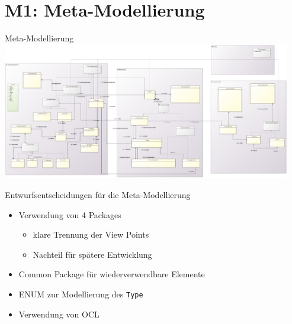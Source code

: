 \section[M1: Metamodell]{M1: Meta-Modellierung}
\begin{frame}{Meta-Modellierung}
	\centering
	\includegraphics[height=60mm]{figures/meta-modell.png}
\end{frame}

\begin{frame}{Entwurfsentscheidungen für die Meta-Modellierung}
	\begin{itemize}
		\item Verwendung von 4 Packages
		\begin{itemize}
			\item klare Trennung der View Points
			\item Nachteil für spätere Entwicklung
		\end{itemize}
		
		\item Common Package für wiederverwendbare Elemente
		\item ENUM zur Modellierung des \texttt{Type}
		\item Verwendung von OCL
	\end{itemize}
\end{frame}